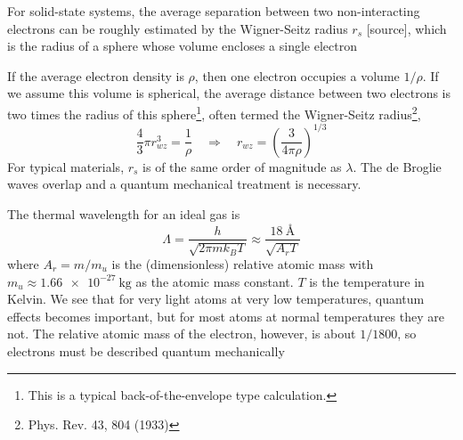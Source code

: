 \documentclass[11pt]{scrbook}   %
\begin{document}
For solid-state systems, the average separation between two non-interacting
electrons can be roughly estimated by the Wigner-Seitz radius $r_s$ [source], 
which is the radius of a sphere whose volume encloses a single electron

If the average electron density is $\rho$, then one electron occupies a volume
$1/\rho$. If we assume this volume is spherical, the average distance between
two electrons is two times the radius of this sphere\footnote{This is a
typical back-of-the-envelope type calculation.}, often termed the 
Wigner-Seitz radius\footnote{Phys. Rev. 43, 804 (1933)},
\begin{equation}
  \frac43\pi r_{wz}^3 = \frac{1}{\rho}\quad
  \Rightarrow \quad r_{wz} = \left(\frac{3}{4\pi\rho}\right)^{1/3}
  \label{eq:wigner-seitz}
\end{equation}
For typical materials, $r_s$ is of the same order of magnitude as $\lambda$. The
de Broglie waves overlap and a quantum mechanical treatment is necessary.

The thermal wavelength for an ideal gas is
\begin{equation}
  \Lambda = \frac{h}{\sqrt{2\pi m k_B T}} \approx \frac{\SI{18}{\angstrom}}{\sqrt{A_r T}}
\end{equation}
where $A_r=m/m_u$ is the (dimensionless) relative atomic mass with
$m_u\approx\SI{1.66e-27}{\kilogram}$ as the atomic mass constant.
$T$ is the temperature in Kelvin.
We see that for very light atoms at very low temperatures, quantum
effects becomes important, but for most atoms at normal temperatures they are not.
The relative atomic mass of the electron, however, is about $1/1800$, so 
electrons must be described quantum mechanically
\end{document}
